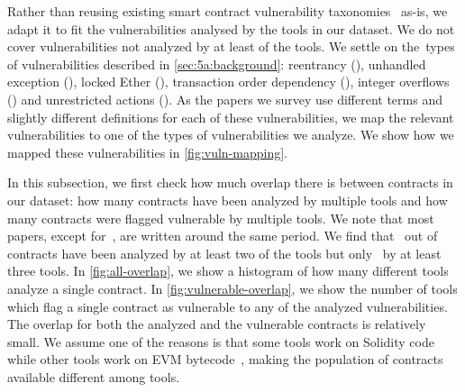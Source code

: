 Rather than reusing existing smart contract vulnerability taxonomies~\cite{atzei2017} as-is, we adapt it to fit the vulnerabilities analysed by the tools in our dataset.
We do not cover vulnerabilities not analyzed by at least  of the \PapersAnalyzed tools. We settle on the~\VulnTypes types of vulnerabilities described in \autoref{sec:5a:background}: reentrancy (\vre), unhandled exception (\vue), locked Ether (\vle), transaction order dependency (\vto), integer overflows (\vio) and unrestricted actions (\vua). As the papers we survey use different terms and slightly different definitions for each of these vulnerabilities, we map the relevant vulnerabilities to one of the \VulnTypes types of vulnerabilities we analyze. We show how we mapped these vulnerabilities in \autoref{fig:vuln-mapping}.


In this subsection, we first check how much overlap there is between contracts in our dataset: how many contracts have been analyzed by multiple tools and how many contracts were flagged vulnerable by multiple tools.
We note that most papers, except for~\cite{luu2016a}, are written around the same period.
We find that~ out of~ contracts have been analyzed by at least two of the tools but only~ by at least three tools.
In \autoref{fig:all-overlap}, we show a histogram of how many different tools analyze a single contract. In \autoref{fig:vulnerable-overlap}, we show the number of tools which flag a single contract as vulnerable to any of the analyzed vulnerabilities. The overlap for both the analyzed and the vulnerable contracts is relatively small. We assume one of the reasons is that some tools work on Solidity code~\cite{DBLP:conf/ndss/KalraGDS18} while other tools work on EVM bytecode~\cite{Tsankov2018,luu2016a}, making the population of contracts available different among tools.

